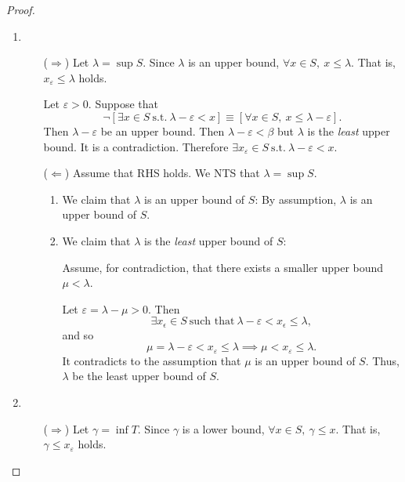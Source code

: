 \documentclass[11pt,openany]{article}
\begin{document}
\begin{proof}
	\begin{enumerate}[(1)]
		\item \begin{itemize}
			\item[($\Rightarrow$)] Let $\lambda=\sup S$. Since $\lambda$ is an upper bound, $\forall x\in S,\ x\leq\lambda$. That is, $x_\varepsilon\leq\lambda$ holds.\par
			Let $\varepsilon>0$. Suppose that \[
			\lnot[\exists x\in S\ \text{s.t.}\ \lambda-\varepsilon<x]\equiv[\forall x\in S,\ x\leq\lambda-\varepsilon].
			\] Then $\lambda-\varepsilon$ be an upper bound. Then $\lambda-\varepsilon<\beta$ but $\lambda$ is the \textit{least} upper bound. It is a contradiction. Therefore $\exists x_\varepsilon\in S\ \text{s.t.}\ \lambda-\varepsilon< x$.
			\vspace{20pt}
			\item[($\Leftarrow$)] Assume that RHS holds. We NTS that $\lambda=\sup S$.
			\vspace{10pt}
			\begin{enumerate}
				\item We claim that $\lambda$ is an upper bound of $S$:	By assumption, $\lambda$ is an upper bound of $S$.
				\vspace{10pt}
				\item We claim that $\lambda$ is the \textit{least} upper bound of $S$:\par
				\begin{center}
				
				\end{center}
				Assume, for contradiction, that there exists a smaller upper bound $\mu<\lambda$.\par
				Let $\varepsilon=\lambda-\mu>0$. Then \[
				\exists x_\epsilon\in S\ \text{such that}\ \lambda-\varepsilon <x_\epsilon\leq\lambda,
				\] and so \[
				\mu=\lambda-\varepsilon <x_\varepsilon\leq\lambda\implies \mu <x_\varepsilon\leq\lambda.
				\] It contradicts to the assumption that $\mu$ is an upper bound of $S$. Thus, $\lambda$ be the least upper bound of $S$.
			\end{enumerate}
		\end{itemize}
		\newpage
		\item \begin{itemize}
			\item[($\Rightarrow$)] Let $\gamma=\inf T$. Since $\gamma$ is a lower bound, $\forall x\in S,\ \gamma\leq x$. That is, $\gamma\leq x_\varepsilon$ holds.\par

\end{itemize}
\end{enumerate}
\end{proof}
\end{document}
